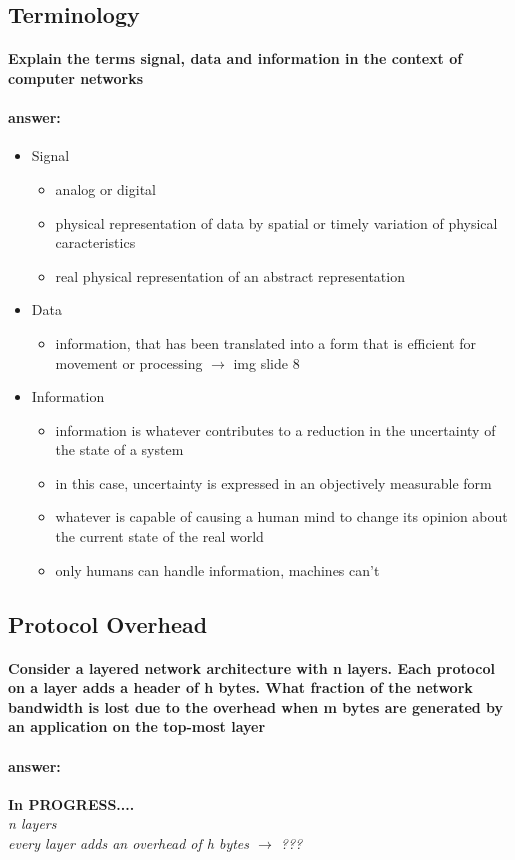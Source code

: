 \documentclass[a4paper,12pt]{article}
\begin{document}
  \subsection{Terminology}
 \paragraph{Explain the terms signal, data and information in the context of computer networks}
 \paragraph{answer:}
 \begin{itemize}
 	\item Signal
 	\begin{itemize}
 		\item  analog or digital
 		\item  physical representation of data by spatial or timely variation of physical caracteristics
 		\item  real physical representation of an abstract representation
 	\end{itemize}
 
 	\item Data
 	\begin{itemize}
 		\item  information, that has been translated into a form that is efficient for movement or processing
 		$\rightarrow$ img slide 8 
 	\end{itemize}
 
 	\item Information
 	\begin{itemize}
 		\item  information is whatever contributes to a reduction in the uncertainty of the state of a system
 		\item  in this case, uncertainty is expressed in an objectively measurable form
 		\item  whatever is capable of causing a human mind to change its opinion about the current state of the real world
 		\item  only humans can handle information, machines can't
 	\end{itemize}
 \end{itemize}
 
  \subsection{Protocol Overhead}
 \paragraph{Consider a layered network architecture with n layers. Each protocol on a layer adds a header of h bytes. What fraction of the network bandwidth is lost due to the overhead when m bytes are generated by an application on the top-most layer}
 \paragraph{answer:}

  \textbf{In PROGRESS....} \\
  \textit{n layers \\
 every layer adds an overhead of h bytes $\rightarrow$ ???}

 
\end{document}
